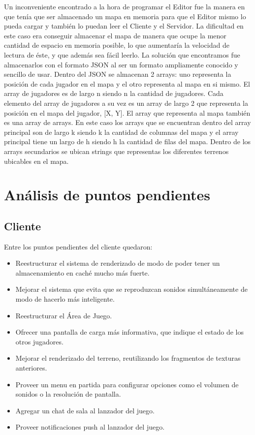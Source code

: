 \documentclass[titlepage,a4paper,12pt]{article}
\begin{document}
Un inconveniente encontrado a la hora de programar el Editor fue la manera en que tenía que ser almacenado un mapa en memoria para que el Editor mismo lo pueda cargar y también lo puedan leer el Cliente y el Servidor. La dificultad en este caso era conseguir almacenar el mapa de manera que ocupe la menor cantidad de espacio en memoria posible, lo que aumentaría la velocidad de lectura de éste, y que además sea fácil leerlo. La solución que encontramos fue almacenarlos con el formato JSON al ser un formato ampliamente conocido y sencillo de usar. Dentro del JSON se almacenan 2 arrays: uno representa la posición de cada jugador en el mapa y el otro representa al mapa en si mismo. El array de jugadores es de largo n siendo n la cantidad de jugadores. Cada elemento del array de jugadores a su vez es un array de largo 2 que representa la posición en el mapa del jugador, [X, Y]. El array que representa al mapa también es una array de arrays. En este caso los arrays que se encuentran dentro del array principal son de largo k siendo k la cantidad de columnas del mapa y el array principal tiene un largo de h siendo h la cantidad de filas del mapa. Dentro de los arrays secundarios se ubican strings que representas los diferentes terrenos ubicables en el mapa.

\section{Análisis de puntos pendientes}

\subsection{Cliente}
Entre los puntos pendientes del cliente quedaron: 
\begin{itemize}
\item Reestructurar el sistema de renderizado de modo de poder tener un almacenamiento en caché mucho más fuerte. 
\item Mejorar el sistema que evita que se reproduzcan sonidos simultáneamente de modo de hacerlo más inteligente.
\item Reestructurar el Área de Juego.
\item Ofrecer una pantalla de carga más informativa, que indique el estado de los otros jugadores.
\item Mejorar el renderizado del terreno, reutilizando los fragmentos de texturas anteriores.
\item Proveer un menu en partida para configurar opciones como el volumen de sonidos o la resolución de pantalla.
\item Agregar un chat de sala al lanzador del juego.
\item Proveer notificaciones push al lanzador del juego.
\end{itemize}
\end{document}
